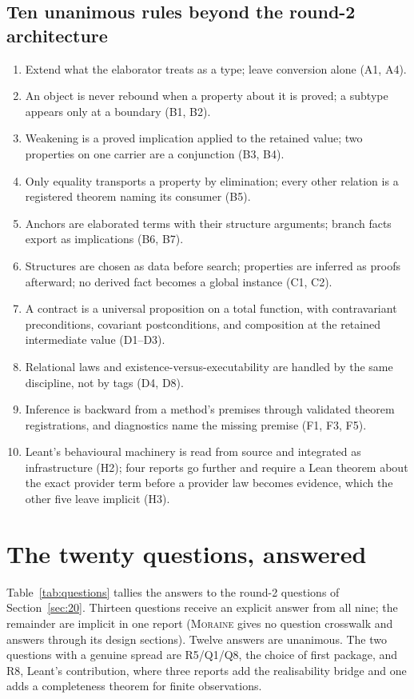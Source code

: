 \documentclass[11pt,a4paper]{article}
\newcommand{\Mr}{\textsc{Moraine}}
\theoremstyle{definition}
\begin{document}
\subsection{Ten unanimous rules beyond the round-2 architecture}
\begin{enumerate}
\item Extend what the elaborator treats as a type; leave conversion alone (A1, A4).
\item An object is never rebound when a property about it is proved; a subtype appears only at a boundary (B1, B2).
\item Weakening is a proved implication applied to the retained value; two properties on one carrier are a conjunction (B3, B4).
\item Only equality transports a property by elimination; every other relation is a registered theorem naming its consumer (B5).
\item Anchors are elaborated terms with their structure arguments; branch facts export as implications (B6, B7).
\item Structures are chosen as data before search; properties are inferred as proofs afterward; no derived fact becomes a global instance (C1, C2).
\item A contract is a universal proposition on a total function, with contravariant preconditions, covariant postconditions, and composition at the retained intermediate value (D1--D3).
\item Relational laws and existence-versus-executability are handled by the same discipline, not by tags (D4, D8).
\item Inference is backward from a method's premises through validated theorem registrations, and diagnostics name the missing premise (F1, F3, F5).
\item Leant's behavioural machinery is read from source and integrated as infrastructure (H2); four reports go further and require a Lean theorem about the exact provider term before a provider law becomes evidence, which the other five leave implicit (H3).
\end{enumerate}

\section{The twenty questions, answered}\label{sec:questions}
Table~\ref{tab:questions} tallies the answers to the round-2 questions of Section~\ref{sec:20}. Thirteen questions receive an explicit answer from all nine; the remainder are implicit in one report (\Mr{} gives no question crosswalk and answers through its design sections). Twelve answers are unanimous. The two questions with a genuine spread are R5/Q1/Q8, the choice of first package, and R8, Leant's contribution, where three reports add the realisability bridge and one adds a completeness theorem for finite observations.
\end{document}
